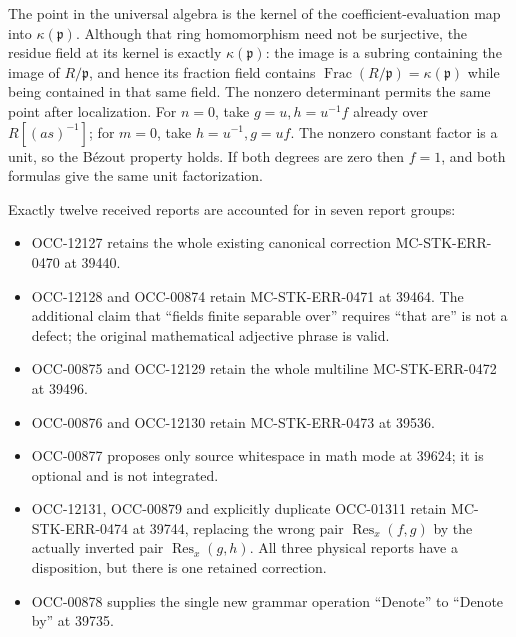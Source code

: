 The point in the universal algebra is the kernel of the coefficient-evaluation map into \(\kappa(\mathfrak p)\). Although that ring homomorphism need not be surjective, the residue field at its kernel is exactly \(\kappa(\mathfrak p)\): the image is a subring containing the image of \(R/\mathfrak p\), and hence its fraction field contains \(\operatorname{Frac}(R/\mathfrak p)=\kappa(\mathfrak p)\) while being contained in that same field. The nonzero determinant permits the same point after localization. For \(n=0\), take \(g=u,h=u^{-1}f\) already over \(R[(as)^{-1}]\); for \(m=0\), take \(h=u^{-1},g=uf\). The nonzero constant factor is a unit, so the Bézout property holds. If both degrees are zero then \(f=1\), and both formulas give the same unit factorization.

Exactly twelve received reports are accounted for in seven report groups:

\begin{itemize}
\tightlist
\item
  OCC-12127 retains the whole existing canonical correction MC-\AlgebraIdentifierBreak{}STK-\AlgebraIdentifierBreak{}ERR-\AlgebraIdentifierBreak{}0470 at 39440.
\item
  OCC-12128 and OCC-00874 retain MC-\AlgebraIdentifierBreak{}STK-\AlgebraIdentifierBreak{}ERR-\AlgebraIdentifierBreak{}0471 at 39464. The additional claim that ``fields finite separable over'' requires ``that are'' is not a defect; the original mathematical adjective phrase is valid.
\item
  OCC-00875 and OCC-12129 retain the whole multiline MC-\AlgebraIdentifierBreak{}STK-\AlgebraIdentifierBreak{}ERR-\AlgebraIdentifierBreak{}0472 at 39496.
\item
  OCC-00876 and OCC-12130 retain MC-\AlgebraIdentifierBreak{}STK-\AlgebraIdentifierBreak{}ERR-\AlgebraIdentifierBreak{}0473 at 39536.
\item
  OCC-00877 proposes only source whitespace in math mode at 39624; it is optional and is not integrated.
\item
  OCC-12131, OCC-00879 and explicitly duplicate OCC-01311 retain MC-\AlgebraIdentifierBreak{}STK-\AlgebraIdentifierBreak{}ERR-\AlgebraIdentifierBreak{}0474 at 39744, replacing the wrong pair \(\operatorname{Res}_x(f,g)\) by the actually inverted pair \(\operatorname{Res}_x(g,h)\). All three physical reports have a disposition, but there is one retained correction.
\item
  OCC-00878 supplies the single new grammar operation ``Denote'' to ``Denote by'' at 39735.
\end{itemize}

